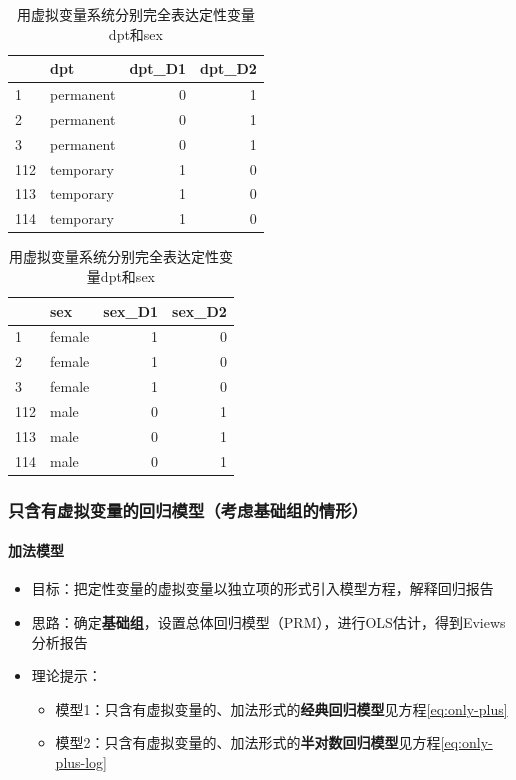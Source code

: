 \documentclass[12pt,(landscape,a4paper),(portrait,a4paper)]{article}
\providecommand{\tightlist}{%
  \setlength{\itemsep}{0pt}\setlength{\parskip}{0pt}}
\let\oldparagraph\paragraph
\renewcommand{\paragraph}[1]{\oldparagraph{#1}\mbox{}}
\theoremstyle{definition}
\theoremstyle{definition}
\theoremstyle{definition}
\theoremstyle{remark}
\begin{document}
\begin{table}
\caption{\label{tab:tab-dpt-sex}用虚拟变量系统分别完全表达定性变量dpt和sex}

\centering
\begin{tabular}[t]{llrr}
\toprule
  & dpt & dpt\_D1 & dpt\_D2\\
\midrule
1 & permanent & 0 & 1\\
2 & permanent & 0 & 1\\
3 & permanent & 0 & 1\\
112 & temporary & 1 & 0\\
113 & temporary & 1 & 0\\
114 & temporary & 1 & 0\\
\bottomrule
\end{tabular}
\centering
\begin{tabular}[t]{llrr}
\toprule
  & sex & sex\_D1 & sex\_D2\\
\midrule
1 & female & 1 & 0\\
2 & female & 1 & 0\\
3 & female & 1 & 0\\
112 & male & 0 & 1\\
113 & male & 0 & 1\\
114 & male & 0 & 1\\
\bottomrule
\end{tabular}
\end{table}

\hypertarget{group1}{%
\subsubsection{只含有虚拟变量的回归模型（考虑基础组的情形）}\label{group1}}

\paragraph{加法模型}

\begin{itemize}
\item
  目标：把定性变量的虚拟变量以独立项的形式引入模型方程，解释回归报告
\item
  思路：确定\textbf{基础组}，设置总体回归模型（PRM），进行OLS估计，得到Eviews分析报告
\item
  理论提示：

  \begin{itemize}
  \tightlist
  \item
    模型1：只含有虚拟变量的、加法形式的\textbf{经典回归模型}见方程\eqref{eq:only-plus}
  \item
    模型2：只含有虚拟变量的、加法形式的\textbf{半对数回归模型}见方程\eqref{eq:only-plus-log}
  \end{itemize}
\end{itemize}
\end{document}
